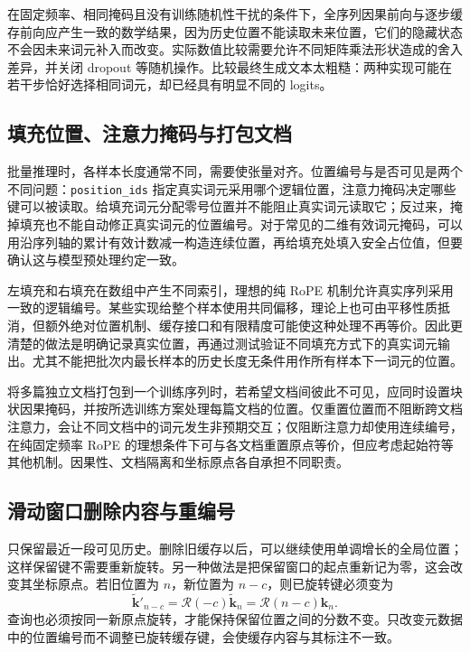 \documentclass[UTF8,12pt,a4paper,fontset=fandol]{ctexart}
\begin{document}
在固定频率、相同掩码且没有训练随机性干扰的条件下，全序列因果前向与逐步缓存前向应产生一致的数学结果，因为历史位置不能读取未来位置，它们的隐藏状态不会因未来词元补入而改变。实际数值比较需要允许不同矩阵乘法形状造成的舍入差异，并关闭 dropout 等随机操作。比较最终生成文本太粗糙：两种实现可能在若干步恰好选择相同词元，却已经具有明显不同的 logits。

\subsection{填充位置、注意力掩码与打包文档}
批量推理时，各样本长度通常不同，需要使张量对齐。位置编号与是否可见是两个不同问题：\texttt{position\_ids} 指定真实词元采用哪个逻辑位置，注意力掩码决定哪些键可以被读取。给填充词元分配零号位置并不能阻止真实词元读取它；反过来，掩掉填充也不能自动修正真实词元的位置编号。对于常见的二维有效词元掩码，可以用沿序列轴的累计有效计数减一构造连续位置，再给填充处填入安全占位值，但要确认这与模型预处理约定一致。

左填充和右填充在数组中产生不同索引，理想的纯 RoPE 机制允许真实序列采用一致的逻辑编号。某些实现给整个样本使用共同偏移，理论上也可由平移性质抵消，但额外绝对位置机制、缓存接口和有限精度可能使这种处理不再等价。因此更清楚的做法是明确记录真实位置，再通过测试验证不同填充方式下的真实词元输出。尤其不能把批次内最长样本的历史长度无条件用作所有样本下一词元的位置。

将多篇独立文档打包到一个训练序列时，若希望文档间彼此不可见，应同时设置块状因果掩码，并按所选训练方案处理每篇文档的位置。仅重置位置而不阻断跨文档注意力，会让不同文档中的词元发生非预期交互；仅阻断注意力却使用连续编号，在纯固定频率 RoPE 的理想条件下可与各文档重置原点等价，但应考虑起始符等其他机制。因果性、文档隔离和坐标原点各自承担不同职责。

\subsection{滑动窗口删除内容与重编号}
只保留最近一段可见历史。删除旧缓存以后，可以继续使用单调增长的全局位置；这样保留键不需要重新旋转。另一种做法是把保留窗口的起点重新记为零，这会改变其坐标原点。若旧位置为 $n$，新位置为 $n-c$，则已旋转键必须变为
\begin{equation}
\widetilde{\mathbf k}'_{n-c}
=\mathcal R(-c)\widetilde{\mathbf k}_n
=\mathcal R(n-c)\mathbf k_n.
\label{eq:rope-rebase}
\end{equation}
查询也必须按同一新原点旋转，才能保持保留位置之间的分数不变。只改变元数据中的位置编号而不调整已旋转缓存键，会使缓存内容与其标注不一致。
\end{document}

